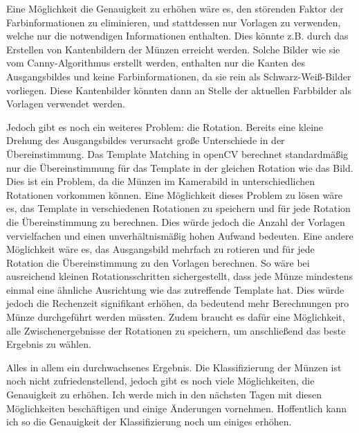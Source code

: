 Eine Möglichkeit die Genauigkeit zu erhöhen wäre es, den störenden Faktor der Farbinformationen zu eliminieren, und stattdessen nur Vorlagen zu verwenden, welche nur die notwendigen Informationen enthalten. Dies könnte z.B. durch das Erstellen von Kantenbildern der Münzen erreicht werden. Solche Bilder wie sie vom Canny-Algorithmus erstellt werden, enthalten nur die Kanten des Ausgangsbildes und keine Farbinformationen, da sie rein als Schwarz-Weiß-Bilder vorliegen. Diese Kantenbilder könnten dann an Stelle der aktuellen Farbbilder als Vorlagen verwendet werden.

Jedoch gibt es noch ein weiteres Problem: die Rotation. Bereits eine kleine Drehung des Ausgangsbildes verursacht große Unterschiede in der Übereinstimmung. Das Template Matching in openCV berechnet standardmäßig nur die Übereinstimmung für das Template in der gleichen Rotation wie das Bild. Dies ist ein Problem, da die Münzen im Kamerabild in unterschiedlichen Rotationen vorkommen können. Eine Möglichkeit dieses Problem zu lösen wäre es, das Template in verschiedenen Rotationen zu speichern und für jede Rotation die Übereinstimmung zu berechnen. Dies würde jedoch die Anzahl der Vorlagen vervielfachen und einen unverhältnismäßig hohen Aufwand bedeuten. Eine andere Möglichkeit wäre es, das Ausgangsbild mehrfach zu rotieren und für jede Rotation die Übereinstimmung zu den Vorlagen berechnen. So wäre bei ausreichend kleinen Rotationsschritten sichergestellt, dass jede Münze mindestens einmal eine ähnliche Ausrichtung wie das zutreffende Template hat. Dies würde jedoch die Rechenzeit signifikant erhöhen, da bedeutend mehr Berechnungen pro Münze durchgeführt werden müssten. Zudem braucht es dafür eine Möglichkeit, alle Zwischenergebnisse der Rotationen zu speichern, um anschließend das beste Ergebnis zu wählen.

Alles in allem ein durchwachsenes Ergebnis. Die Klassifizierung der Münzen ist noch nicht zufriedenstellend, jedoch gibt es noch viele Möglichkeiten, die Genauigkeit zu erhöhen. Ich werde mich in den nächsten Tagen mit diesen Möglichkeiten beschäftigen und einige Änderungen vornehmen. Hoffentlich kann ich so die Genauigkeit der Klassifizierung noch um einiges erhöhen. 